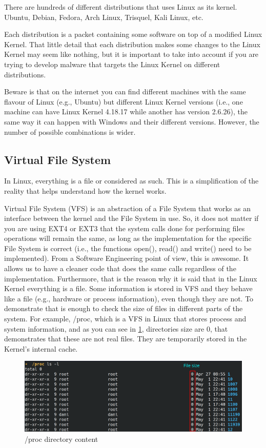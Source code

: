 \documentclass[11pt, a4paper,twoside]{tesi_upf}
\begin{document}
There are hundreds of different distributions that uses Linux as its kernel. Ubuntu, Debian, Fedora, Arch Linux, Trisquel, Kali Linux, etc. 

Each distribution is a packet containing some software on top of a modified Linux Kernel. That little detail that each distribution makes some changes to the Linux Kernel may seem like nothing, but it is important to take into account if you are trying to develop malware that targets the Linux Kernel on different distributions.

Beware is that on the internet you can find different machines with the same flavour of Linux (e.g., Ubuntu) but different Linux Kernel versions (i.e., one machine can have Linux Kernel 4.18.17 while another has version 2.6.26), the same way it can happen with Windows and their different versions. However, the number of possible combinations is wider.

\subsection{Virtual File System}

In Linux, everything is a file or considered as such. This is a simplification of the reality that helps understand how the kernel works.

Virtual File System (VFS) is an abstraction of a File System that works as an interface between the kernel and the File System in use. So, it does not matter if you are using EXT4 or EXT3 that the system calls done for performing files operations will remain the same, as long as the implementation for the specific File System is correct (i.e., the functions open(), read() and write() need to be implemented).
From a Software Engineering point of view, this is awesome. It allows us to have a cleaner code that does the same calls regardless of the implementation. Furthermore, that is the reason why it is said that in the Linux Kernel everything is a file. Some information is stored in VFS and they behave like a file (e.g., hardware or process information), even though they are not. To demonstrate that is enough to check the size of files in different parts of the system. For example, /proc, which is a VFS in Linux that stores process and system information, and as you can see in \ref{fig:all_is_a_file}, directories size are 0, that demonstrates that these are not real files. They are temporarily stored in the Kernel's internal cache.

\begin{figure}
    \centering
    \includegraphics[width=\linewidth]{images/all_is_a_file.png}
    \caption{/proc directory content}
    \label{fig:all_is_a_file}
\end{figure}
\end{document}
